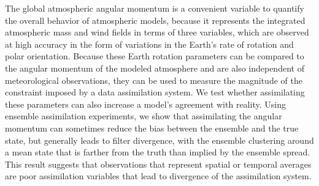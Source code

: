 The global atmospheric angular momentum is a convenient variable to quantify the overall behavior of atmospheric models, because it represents the integrated atmospheric mass and wind fields in terms of three variables, which are observed at high accuracy in the form of variations in the Earth's rate of rotation and polar orientation. 
%
Because these Earth rotation parameters can be compared to the angular momentum of the modeled atmosphere and are also independent of meteorological observations, they can be used to measure 
the magnitude of the constraint imposed by a data assimilation system.
%
We test whether assimilating these parameters can also increase a model's agreement with reality. 
Using ensemble assimilation experiments, we show that  
assimilating the angular momentum can sometimes reduce the bias between the ensemble and the true state, but generally leads to filter divergence, with the ensemble clustering around a mean state that is farther from the truth than implied by the ensemble spread. 
This result suggests that observations that represent spatial or temporal averages are poor assimilation variables that lead to divergence of the assimilation system.  
